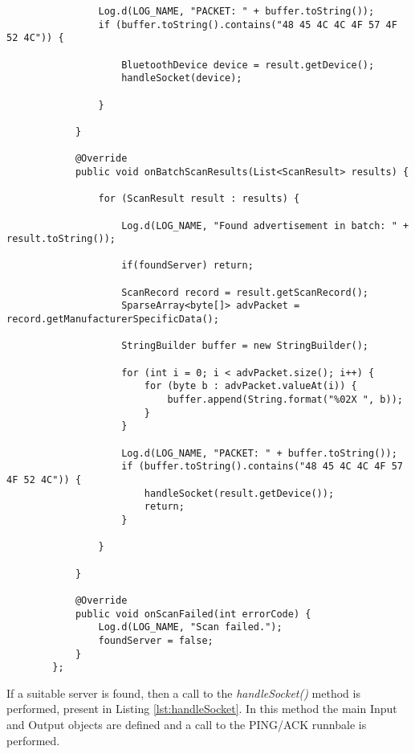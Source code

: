 \begin{lstlisting}
                Log.d(LOG_NAME, "PACKET: " + buffer.toString());
                if (buffer.toString().contains("48 45 4C 4C 4F 57 4F 52 4C")) {

                    BluetoothDevice device = result.getDevice();
                    handleSocket(device);
                    
                }

            }

            @Override
            public void onBatchScanResults(List<ScanResult> results) {

                for (ScanResult result : results) {

                    Log.d(LOG_NAME, "Found advertisement in batch: " + result.toString());

                    if(foundServer) return;

                    ScanRecord record = result.getScanRecord();
                    SparseArray<byte[]> advPacket = record.getManufacturerSpecificData();

                    StringBuilder buffer = new StringBuilder();

                    for (int i = 0; i < advPacket.size(); i++) {
                        for (byte b : advPacket.valueAt(i)) {
                            buffer.append(String.format("%02X ", b));
                        }
                    }

                    Log.d(LOG_NAME, "PACKET: " + buffer.toString());
                    if (buffer.toString().contains("48 45 4C 4C 4F 57 4F 52 4C")) {
                        handleSocket(result.getDevice());
                        return;
                    }

                }

            }

            @Override
            public void onScanFailed(int errorCode) {
                Log.d(LOG_NAME, "Scan failed.");
                foundServer = false;
            }
        };

\end{lstlisting}


If a suitable server is found, then a call to the \textit{handleSocket()} method is performed, present in Listing \ref{lst:handleSocket}. In this method the main Input and Output objects are defined and a call to the PING/ACK runnbale is performed.


